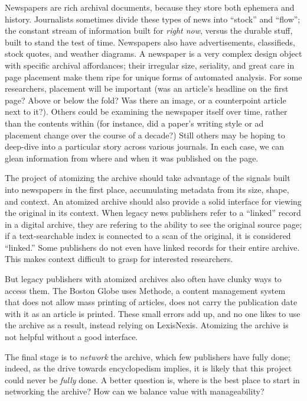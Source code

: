 Newspapers are rich archival documents, because they store both ephemera and history. Journalists sometimes divide these types of news into ``stock'' and ``flow''; the constant stream of information built for \emph{right now}, versus the durable stuff, built to stand the test of time. Newspapers also have advertisements, classifieds, stock quotes, and weather diagrams. A newspaper is a very complex design object with specific archival affordances; their irregular size, seriality, and great care in page placement make them ripe for unique forms of automated analysis. For some researchers, placement will be important (was an article’s headline on the first page? Above or below the fold? Was there an image, or a counterpoint article next to it?). Others could be examining the newspaper itself over time, rather than the contents within (for instance, did a paper’s writing style or ad placement change over the course of a decade?) Still others may be hoping to deep-dive into a particular story across various journals. In each case, we can glean information from where and when it was published on the page.

The project of atomizing the archive should take advantage of the signals built into newspapers in the first place, accumulating metadata from its size, shape, and context. An atomized archive should also provide a solid interface for viewing the original in its context. When legacy news publishers refer to a ``linked'' record in a digital archive, they are refering to the ability to see the original source page; if a text-searchable index is connected to a scan of the original, it is considered ``linked.'' Some publishers do not even have linked records for their entire archive. This makes context difficult to grasp for interested researchers.

But legacy publishers with atomized archives also often have clunky ways to access them. The Boston Globe uses Methode, a content management system that does not allow mass printing of articles, does not carry the publication date with it as an article is printed. These small errors add up, and no one likes to use the archive as a result, instead relying on LexisNexis. Atomizing the archive is not helpful without a good interface.

The final stage is to \emph{network} the archive, which few publishers have fully done; indeed, as the drive towards encyclopedism implies, it is likely that this project could never be \emph{fully} done. A better question is, where is the best place to start in networking the archive? How can we balance value with manageability?

